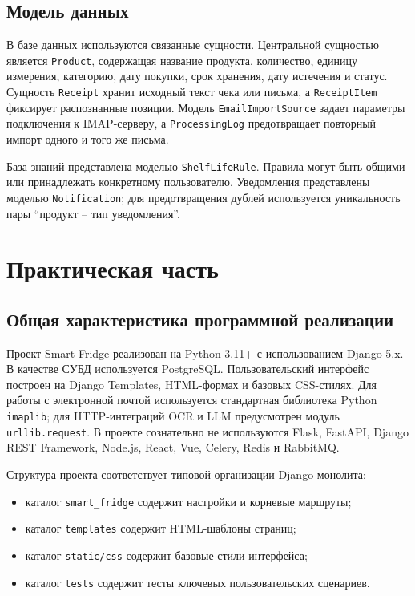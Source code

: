 \documentclass[14pt,a4paper]{extreport}
\renewcommand{\thechapter}{\arabic{chapter}}
\begin{document}
\section{Модель данных}

В базе данных используются связанные сущности. Центральной сущностью является \texttt{Product}, содержащая название продукта, количество, единицу измерения, категорию, дату покупки, срок хранения, дату истечения и статус. Сущность \texttt{Receipt} хранит исходный текст чека или письма, а \texttt{ReceiptItem} фиксирует распознанные позиции. Модель \texttt{EmailImportSource} задает параметры подключения к IMAP-серверу, а \texttt{ProcessingLog} предотвращает повторный импорт одного и того же письма.

База знаний представлена моделью \texttt{ShelfLifeRule}. Правила могут быть общими или принадлежать конкретному пользователю. Уведомления представлены моделью \texttt{Notification}; для предотвращения дублей используется уникальность пары ``продукт -- тип уведомления''.

\newpage
\chapter[Глава \thechapter Практическая часть]{Практическая часть}

\section{Общая характеристика программной реализации}

Проект Smart Fridge реализован на Python 3.11+ с использованием Django 5.x. В качестве СУБД используется PostgreSQL. Пользовательский интерфейс построен на Django Templates, HTML-формах и базовых CSS-стилях. Для работы с электронной почтой используется стандартная библиотека Python \texttt{imaplib}; для HTTP-интеграций OCR и LLM предусмотрен модуль \texttt{urllib.request}. В проекте сознательно не используются Flask, FastAPI, Django REST Framework, Node.js, React, Vue, Celery, Redis и RabbitMQ.

Структура проекта соответствует типовой организации Django-монолита:
\begin{itemize}
  \item каталог \texttt{smart\_fridge} содержит настройки и корневые маршруты;
  \item каталог \texttt{templates} содержит HTML-шаблоны страниц;
  \item каталог \texttt{static/css} содержит базовые стили интерфейса;
  \item каталог \texttt{tests} содержит тесты ключевых пользовательских сценариев.
\end{itemize}
\end{document}
